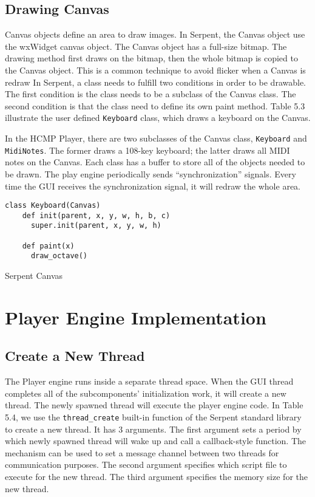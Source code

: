 \subsection{Drawing Canvas}
 
Canvas objects define an area to draw images. In Serpent, the Canvas 
object use the wxWidget canvas object. The Canvas object has a full-size bitmap.
The drawing method first draws on the bitmap, then the whole bitmap is copied 
to the Canvas object. This is a common technique to avoid flicker when a Canvas is 
redraw In Serpent, a class needs to fulfill two conditions in order 
to be drawable. The first condition is
the class needs to be a subclass of the Canvas class. The second condition is that 
the class need to define its own paint method. Table 5.3 illustrate the user 
defined \texttt{Keyboard} class, which draws a keyboard on the Canvas.

In the HCMP Player, there are two subclasses of the Canvas class, 
\texttt{Keyboard} and \texttt{MidiNotes}. The former draws a 108-key 
keyboard; the latter draws all MIDI notes on the Canvas. Each class has a buffer 
to store all of the objects needed to be drawn. The play engine periodically 
sends ``synchronization'' signals. Every time the GUI receives the synchronization 
signal, it will redraw the whole area.

\begin{table}[htdp]
\centering

\begin{lstlisting}
class Keyboard(Canvas)
    def init(parent, x, y, w, h, b, c)
      super.init(parent, x, y, w, h)

    def paint(x)
      draw_octave()
\end{lstlisting}
\caption[Serpent Canvas]{Serpent Canvas}
\end{table}

\section{Player Engine Implementation}

\subsection{Create a New Thread}
The Player engine runs inside a separate thread space. When the GUI thread completes 
all of the subcomponents' initialization work, it will create a new thread. The newly
spawned thread will execute the player engine code. In Table 5.4, we use the   
\texttt{thread\_create} built-in function of the Serpent standard library to create 
a new thread. It has 3 arguments. 
The first argument sets a period by which newly spawned thread will wake up and call 
a callback-style function. The mechanism can be used to set a message channel between 
two threads for communication purposes. The second argument specifies 
which script file to execute for the new thread. The third argument specifies the 
memory size for the new thread.

